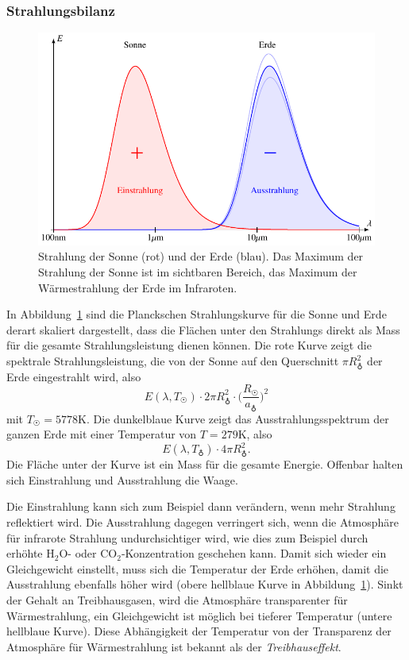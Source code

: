 \subsubsection{Strahlungsbilanz}
\begin{figure}
\centering
\includegraphics{chapters/1/vergleich.pdf}
\caption{Strahlung der Sonne (rot) und der Erde (blau).
Das Maximum der Strahlung der Sonne ist im sichtbaren Bereich,
das Maximum der Wärmestrahlung der Erde im Infraroten.
\label{skript:strahlung-sonne-erde}}
\end{figure}%
In Abbildung~\ref{skript:strahlung-sonne-erde} sind die Planckschen
Strahlungskurve für die Sonne und Erde derart skaliert dargestellt,
dass die Flächen unter den Strahlungs direkt als Mass für die gesamte
Strahlungsleistung dienen können.
Die rote Kurve zeigt die spektrale Strahlungsleistung, die von der
Sonne auf den Querschnitt $\pi R_{\earth}^2$ der Erde eingestrahlt wird,
also
\[
E(\lambda,T_{\astrosun}) \cdot 2\pi R_{\earth}^2
\cdot
\biggl(\frac{R_{\astrosun}}{a_{\earth}}\biggr)^2
\]
mit $T_{\astrosun}=5778\text{K}$.
Die dunkelblaue Kurve zeigt das Ausstrahlungsspektrum der ganzen Erde mit
einer Temperatur von $T=279\text{K}$, also
\[
E(\lambda,T_{\earth})\cdot 4\pi R_{\earth}^2.
\]
Die Fläche unter der Kurve ist ein Mass für die gesamte Energie.
Offenbar halten sich Einstrahlung und Ausstrahlung die Waage.

Die Einstrahlung kann sich zum Beispiel dann verändern, wenn 
mehr Strahlung reflektiert wird.
Die Ausstrahlung dagegen verringert sich, wenn die Atmosphäre für infrarote
Strahlung undurchsichtiger wird, wie dies zum Beispiel durch
erhöhte $\text{H}_2\text{O}$- oder $\text{CO}_2$-Konzentration geschehen kann.
Damit sich wieder ein Gleichgewicht einstellt, muss sich die Temperatur der
Erde erhöhen, damit die Ausstrahlung ebenfalls höher wird
(obere hellblaue Kurve in Abbildung~\ref{skript:strahlung-sonne-erde}).
Sinkt der Gehalt an Treibhausgasen, wird die Atmosphäre transparenter
für Wärmestrahlung,
ein Gleichgewicht ist möglich bei tieferer Temperatur (untere
hellblaue Kurve).
Diese Abhängigkeit der Temperatur von der Transparenz der
Atmosphäre für Wärmestrahlung ist bekannt als der {\em Treibhauseffekt}.

